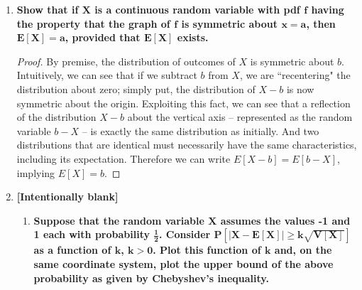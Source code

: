 \documentclass[10pt, oneside]{article}
\begin{document}
\begin{enumerate}[label=7.\arabic*]
\begin{enumerate}
	  Therefore, the exact value of $E[Z]$ is given by
	  
	  \[ E[Z] = \int^1_{1/2} z \Big( 2 - \frac{1}{2z^2} \Big) \ dz + \int^2_1 z \Big( \frac{2}{z^2} - \frac{1}{2} \Big) \ dz \approx \boxed{1.0397} \]
	  
	  And $V[Z]$ by
	  
	  \[ V[Z] = \int^1_{1/2} (z - E[Z])^2 \Big( 2 - \frac{1}{2z^2} \Big) \ dz + \int^2_1 (z - E[Z])^2 \Big( \frac{2}{z^2} - \frac{1}{2} \Big) \ dz \approx \boxed{0.0856} \]
	  
	\end{enumerate}

\item  \begin{tcolorbox}[
  colback=Cerulean!5!white,
  colframe=Cerulean!75!black]
  \textbf{Show that if $\bm{X}$ is a continuous random variable with pdf $\bm{f}$ having the property that the graph of $\bm{f}$ is symmetric about $\bm{x = a}$, then $\bm{E[X] = a}$, provided that $\bm{E[X]}$ exists.}
  \end{tcolorbox}
  
  \begin{proof}
  By premise, the distribution of outcomes of $X$ is symmetric about $b$. Intuitively, we can see that if we subtract $b$ from $X$, we are ``recentering" the distribution about zero; simply put, the distribution of $X-b$ is now symmetric about the origin. Exploiting this fact, we can see that a reflection of the distribution $X-b$ about the vertical axis -- represented as the random variable $b - X$ -- is exactly the same distribution as initially. And two distributions that are identical must necessarily have the same characteristics, including its expectation. Therefore we can write $E[X - b] = E[b - X]$, implying $\boxed{E[X] = b}$.
  \end{proof}
  
\item  \begin{tcolorbox}[
  colback=Cerulean!5!white,
  colframe=Cerulean!75!black]
  \textbf{[Intentionally blank]}
  \end{tcolorbox}
  
  	\begin{enumerate}
	\item  \begin{tcolorbox}[
	  colback=Cerulean!5!white,
	  colframe=Cerulean!75!black]
	  \textbf{Suppose that the random variable $\bm{X}$ assumes the values -1 and 1 each with probability $\bm{\frac{1}{2}}$. Consider $\bm{P[|X - E[X]| \geq k \sqrt{V[X]}]}$ as a function of $\bm{k}$, $\bm{k > 0}$. Plot this function of $\bm{k}$ and, on the same coordinate system, plot the upper bound of the above probability as given by Chebyshev's inequality.} 
	  \end{tcolorbox}
	  

\end{enumerate}
\end{enumerate}
\end{document}
